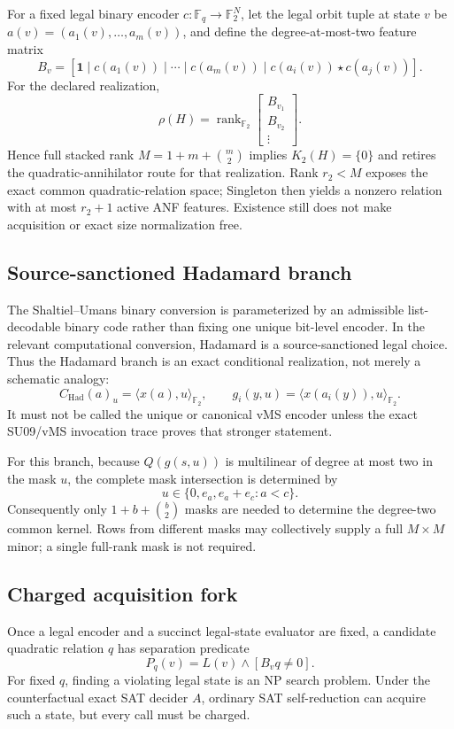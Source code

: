 \documentclass[11pt]{article}
\begin{document}
For a fixed legal binary encoder \(c:\mathbb F_q\to\mathbb F_2^N\), let the legal
orbit tuple at state \(v\) be \(a(v)=(a_1(v),\ldots,a_m(v))\), and define the
degree-at-most-two feature matrix
\[
 B_v=
 \left[
 \mathbf 1\mid
 c(a_1(v))\mid\cdots\mid c(a_m(v))
 \mid
 c(a_i(v))\star c(a_j(v))
 \right].
\]
For the declared realization,
\[
 \boxed{\rho(H)=\operatorname{rank}_{\mathbb F_2}
 \begin{bmatrix}B_{v_1}\\B_{v_2}\\\vdots\end{bmatrix}}.
\]
Hence full stacked rank \(M=1+m+\binom m2\) implies
\(K_2(H)=\{0\}\) and retires the quadratic-annihilator route for that
realization.  Rank \(r_2<M\) exposes the exact common quadratic-relation
space; Singleton then yields a nonzero relation with at most \(r_2+1\)
active ANF features.  Existence still does not make acquisition or exact
size normalization free.

\subsection{Source-sanctioned Hadamard branch}

The Shaltiel--Umans binary conversion is parameterized by an admissible
list-decodable binary code rather than fixing one unique bit-level encoder.
In the relevant computational conversion, Hadamard is a source-sanctioned
legal choice.  Thus the Hadamard branch is an exact conditional realization,
not merely a schematic analogy:
\[
 C_{\mathrm{Had}}(a)_u=\langle x(a),u\rangle_{\mathbb F_2},
 \qquad
 g_i(y,u)=\langle x(a_i(y)),u\rangle_{\mathbb F_2}.
\]
It must not be called the unique or canonical vMS encoder unless the exact
SU09/vMS invocation trace proves that stronger statement.

For this branch, because \(Q(g(s,u))\) is multilinear of degree at most two
in the mask \(u\), the complete mask intersection is determined by
\[
 u\in\{0,e_a,e_a+e_c:a<c\}.
\]
Consequently only \(1+b+\binom b2\) masks are needed to determine the
degree-two common kernel.  Rows from different masks may collectively
supply a full \(M\times M\) minor; a single full-rank mask is not required.

\subsection{Charged acquisition fork}

Once a legal encoder and a succinct legal-state evaluator are fixed, a
candidate quadratic relation \(q\) has separation predicate
\[
 P_q(v)=L(v)\wedge[B_vq\ne0].
\]
For fixed \(q\), finding a violating legal state is an NP search problem.
Under the counterfactual exact SAT decider \(A\), ordinary SAT
self-reduction can acquire such a state, but every call must be charged.
\end{document}
